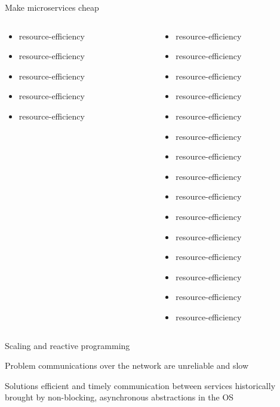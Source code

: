 \documentclass{beamer}
\begin{document}
\begin{frame}{Make microservices cheap}
\begin{columns}
\begin{column}{0.36\textwidth}
\begin{itemize}
                \item resource-efficiency
                \item resource-efficiency
                \item resource-efficiency
                \item resource-efficiency
                \item resource-efficiency
            \end{itemize}
        \end{column}
        \begin{column}{0.36\textwidth}
            \begin{itemize}
                \item resource-efficiency
                \item resource-efficiency
                \item resource-efficiency
                \item resource-efficiency
                \item resource-efficiency
                \item resource-efficiency
                \item resource-efficiency
                \item resource-efficiency
                \item resource-efficiency
                \item resource-efficiency
                \item resource-efficiency
                \item resource-efficiency
                \item resource-efficiency
                \item resource-efficiency
                \item resource-efficiency
            \end{itemize}
        \end{column}
    \end{columns}
\end{frame}
\begin{frame}{Scaling and reactive programming}
    \begin{alertblock}{Problem}
        communications over the network are unreliable and slow
    \end{alertblock}
    \begin{block}{Solutions}
        efficient and timely communication between services
        historically brought by non-blocking, asynchronous abstractions in the OS
    \end{block}
\end{frame}
\end{document}
